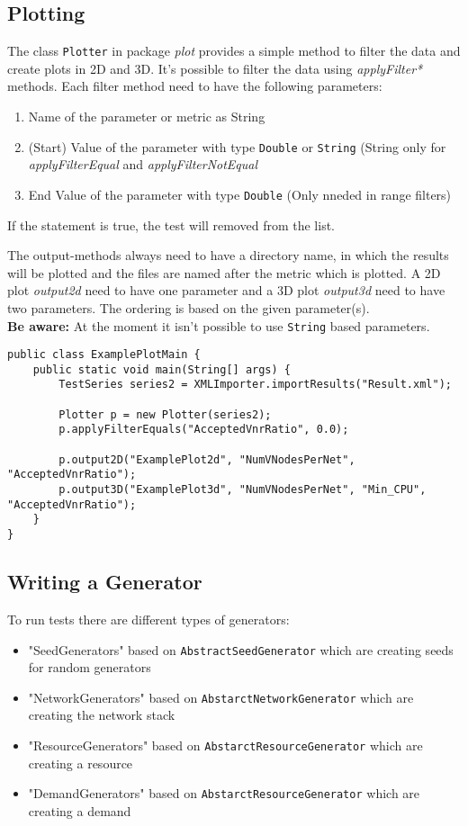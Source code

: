 \subsection{Plotting}
The class \texttt{Plotter} in package \textit{plot} provides a simple method to filter the data and create plots in 2D and 3D.
It's possible to filter the data using \textsl{applyFilter*} methods.
Each filter method need to have the following parameters:
\begin{enumerate}
	\item Name of the parameter or metric as String
	\item (Start) Value of the parameter with type \texttt{Double} or \texttt{String} (String only for \textsl{applyFilterEqual} and \textsl{applyFilterNotEqual}
	\item End Value of the parameter with type \texttt{Double} (Only nneded in range filters)
\end{enumerate}
If the statement is true, the test will removed from the list.

The output-methods always need to have a directory name, in which the results will be plotted and the files are named after the metric which is plotted.
A 2D plot \textsl{output2d} need to have one parameter and a 3D plot \textsl{output3d} need to have two parameters.
The ordering is based on the given parameter(s).
\\
\textbf{Be aware:} At the moment it isn't possible to use \texttt{String} based parameters.

\begin{lstlisting}
public class ExamplePlotMain {
	public static void main(String[] args) {
		TestSeries series2 = XMLImporter.importResults("Result.xml");
		
		Plotter p = new Plotter(series2);
		p.applyFilterEquals("AcceptedVnrRatio", 0.0);
		
		p.output2D("ExamplePlot2d", "NumVNodesPerNet", "AcceptedVnrRatio");
		p.output3D("ExamplePlot3d", "NumVNodesPerNet", "Min_CPU", "AcceptedVnrRatio");
	}
}
\end{lstlisting}



\subsection{Writing a Generator}
To run tests there are different types of generators:
\begin{itemize}
	\item "SeedGenerators" based on \texttt{AbstractSeedGenerator} which are creating seeds for random generators
	\item "NetworkGenerators" based on \texttt{AbstarctNetworkGenerator} which are creating the network stack
	\item "ResourceGenerators" based on \texttt{AbstarctResourceGenerator} which are creating a resource
	\item "DemandGenerators" based on \texttt{AbstarctResourceGenerator} which are creating a demand
\end{itemize}


